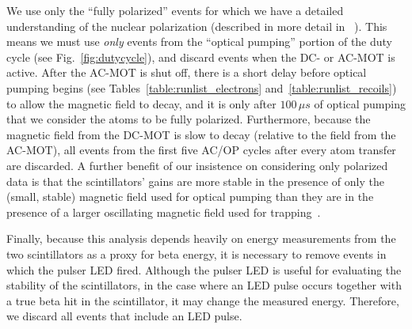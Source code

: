 We use only the ``fully polarized'' events for which we have a detailed understanding of the nuclear polarization (described in more detail in ~\cite{ben_OP}).  This means we must use \emph{only} events from the ``optical pumping'' portion of the duty cycle (see Fig.~\ref{fig:dutycycle}), and discard events when the DC- or AC-MOT is active.  After the AC-MOT is shut off, there is a short delay before optical pumping begins (see Tables~\ref{table:runlist_electrons} and~\ref{table:runlist_recoils}) to allow the magnetic field to decay, and it is only after $100\,\mu s$ of optical pumping that we consider the atoms to be fully polarized.  Furthermore, because the magnetic field from the DC-MOT is slow to decay (relative to the field from the AC-MOT), all events from the first five AC/OP cycles after every atom transfer are discarded.  A further benefit of our insistence on considering only polarized data is that the scintillators' gains are more stable in the presence of only the (small, stable) magnetic field used for optical pumping than they are in the presence of a larger oscillating magnetic field used for trapping~\cite{ben_thesis}.

Finally, because this analysis depends heavily on energy measurements from the two scintillators as a proxy for beta energy, it is necessary to remove events in which the pulser LED fired.  Although the pulser LED is useful for evaluating the stability of the scintillators, in the case where an LED pulse occurs together with a true beta hit in the scintillator, it may change the measured energy.  Therefore, we discard all events that include an LED pulse.   
	




